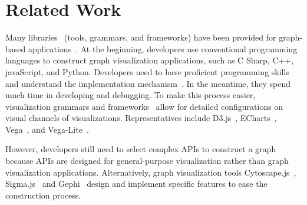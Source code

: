 \section{Related Work}

Many libraries~\cite{DBLP:journals/vi/LiMSSZWZC18,mei2020datav,tableau} (tools, grammars, and frameworks) have been provided for graph-based applications~\cite{wang2018graphprotector,pan2020exemplar}.
At the beginning, developers use conventional programming languages to construct graph visualization applications, such as C Sharp, C++, javaScript, and Python. Developers need to have proficient programming skills and understand the implementation mechanism~\cite{reas2003processing,reas2005processing}.
In the meantime, they spend much time in developing and debugging. To make this process easier, visualization grammars and frameworks~\cite{lyra,lyra2,heer2010declarative} allow for detailed configurations on  visual channels of visualizations. Representatives include D3.js~\cite{DBLP:journals/tvcg/BostockOH11}, ECharts~\cite{DBLP:journals/vi/LiMSSZWZC18}, Vega~\cite{DBLP:journals/tvcg/SatyanarayanRHH16}, and Vega-Lite~\cite{DBLP:journals/tvcg/SatyanarayanMWH17}.


However, developers still need to  select complex APIs  to construct a graph\deleted[id=kg]{,} because APIs are designed for general-purpose visualization rather than graph visualization applications. Alternatively, graph visualization tools  Cytoscape.js~\cite{DBLP:journals/bioinformatics/FranzLHDSB16}, Sigma.js~\cite{DBLP:journals/jossw/Coene18}\added[id=kg]{,} and Gephi~\cite{DBLP:conf/icwsm/BastianHJ09}\added[id=kg]{,} design and implement specific features to ease the construction process. 


